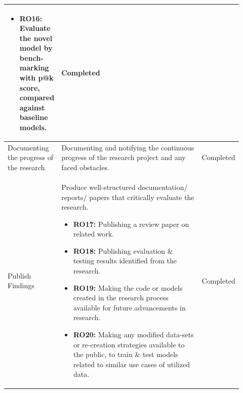 \begin{longtable}{| p{0.135\linewidth} | p{0.63\linewidth}| p{0.15\linewidth}|}
\begin{itemize}
\item \textbf{RO16:} Evaluate the novel model by bench-marking with  \Gls{p@k} score, compared against baseline models.
\vspace{-7mm}       %
\end{itemize}
&
Completed\\
\hline
Documenting the progress of the research & Documenting and notifying the continuous progress of the research project and any faced obstacles. 
&
Completed\\
\hline
Publish Findings & Produce well-structured documentation/ reports/ papers that critically evaluate the research.
\begin{itemize}
\item \textbf{RO17:} Publishing a review paper on related work.
\item \textbf{RO18:} Publishing evaluation \& testing results identified from the research.
\item \textbf{RO19:} Making the code or models created in the research process available for future advancements in research.
\item \textbf{RO20:} Making any modified data-sets or re-creation strategies available to the public, to train \& test models related to similar use cases of utilized data.
\vspace{-7mm}       %
\end{itemize}
&
Completed\\
\hline
\end{longtable}